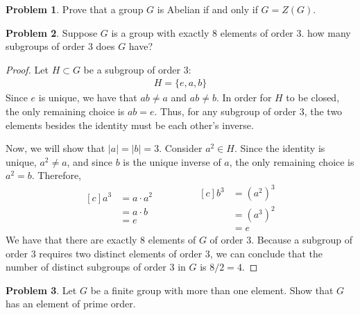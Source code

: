 \documentclass[12pt,reqno]{article}
\theoremstyle{plain}
\theoremstyle{definition}
\newtheorem{problem}{Problem}
\begin{document}
\newpage


\begin{problem} 
    Prove that a group $G$ is Abelian if and only if $G = Z(G)$.
\end{problem}

\newpage


\begin{problem} 
    Suppose $G$ is a group with exactly 8 elements of order $3$. how many subgroups of order $3$ does $G$ have?
\end{problem}

\begin{proof}
    Let \(H\subset G\) be a subgroup of order 3:
    \begin{align*}
        H = \{e, a, b\}
    \end{align*}
    Since \(e\) is unique, we have that \(ab\neq a\) and \(ab\neq b\). In order for \(H\) to be closed, 
    the only remaining choice is \(ab = e\). Thus, for any subgroup of order \(3\), the two elements besides
    the identity must be each other's inverse.

    Now, we will show that \(|a|=|b|=3\). Consider \(a^2\in H\). Since the identity is unique, \(a^2\neq a\),
    and since \(b\) is the unique inverse of \(a\), the only remaining choice is \(a^2=b\). Therefore,
    \begin{equation*}
        \begin{aligned}[c]
            a^3 &= a \cdot a^2 \\
            &= a \cdot b\\
            &= e
        \end{aligned}
        \qquad\qquad
        \begin{aligned}[c]
            b^3 &= (a^2)^3\\
            &= (a^3)^2\\
            &= e
        \end{aligned}
    \end{equation*}
    We have that there are exactly \(8\) elements of \(G\) of order \(3\). Because a subgroup of order \(3\) 
    requires two distinct elements of order \(3\), we can conclude that the number of distinct subgroups of 
    order \(3\) in \(G\) is \(8 / 2 = 4\).
\end{proof}

\newpage


\begin{problem} 
    Let $G$ be a finite group with more than one element. Show that $G$ has an element of prime order.
\end{problem}
\end{document}
